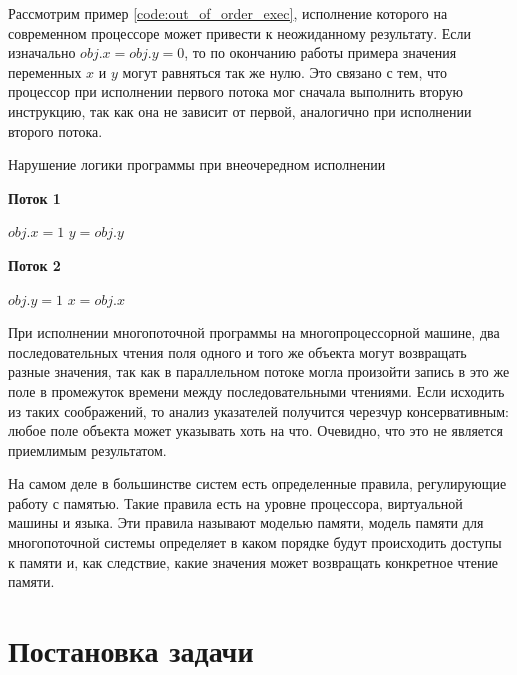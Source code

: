 \documentclass[14pt,titlepage]{extarticle}
\newcommand{\algorithmictitle}[1]{\hspace{8mm}\textbf{#1}}
\let\oldsection\section
\renewcommand{\section}{\newpage\oldsection}
\begin{document}
      Рассмотрим пример \ref{code:out_of_order_exec}, исполнение которого на
      современном процессоре может привести к неожиданному результату.
      Если изначально $obj.x = obj.y = 0$, то по окончанию работы примера
      значения переменных $x$ и $y$ могут равняться так же нулю. Это связано с
      тем, что процессор при исполнении первого потока мог сначала выполнить
      вторую инструкцию, так как она не зависит от первой, аналогично при
      исполнении второго потока.

      \begin{algorithm}
        \caption{Нарушение логики программы при внеочередном исполнении}
        \label{code:out_of_order_exec}
        \begin{multicols*}{2}
          \algorithmictitle{Поток 1}
          \begin{algorithmic}[1]
            \STATE $obj.x = 1$
            \STATE $y = obj.y$
          \end{algorithmic}
          \columnbreak
          \algorithmictitle{Поток 2}
          \begin{algorithmic}[1]
            \STATE $obj.y = 1$
            \STATE $x = obj.x$
          \end{algorithmic}
        \end{multicols*}
      \end{algorithm}


      При исполнении многопоточной программы на многопроцессорной машине,
      два последовательных чтения поля одного и того же объекта могут
      возвращать разные значения, так как в параллельном потоке могла произойти
      запись в это же поле в промежуток времени между последовательными
      чтениями. Если исходить из таких соображений, то анализ указателей
      получится черезчур консервативным: любое поле объекта может указывать
      хоть на что. Очевидно, что это не является приемлимым результатом.

      На самом деле в большинстве систем есть определенные правила,
      регулирующие работу с памятью. Такие правила есть на уровне процессора,
      виртуальной машины и языка. Эти правила называют моделью памяти,
      модель памяти для многопоточной системы определяет в каком
      порядке будут происходить доступы к памяти и, как следствие, какие
      значения может возвращать конкретное чтение памяти.


  \section{Постановка задачи}
\end{document}
